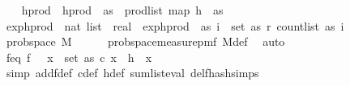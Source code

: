 \begin{isabellebody}
\ \ \isamarkupfalse%
\ h{\isacharunderscore}{\kern0pt}prod\ \ {\isachardoublequoteopen}h{\isacharunderscore}{\kern0pt}prod\ {\isacharequal}{\kern0pt}\ {\isacharparenleft}{\kern0pt}{\isasymlambda}as\ {\isasymomega}{\isachardot}{\kern0pt}\ prod{\isacharunderscore}{\kern0pt}list\ {\isacharparenleft}{\kern0pt}map\ {\isacharparenleft}{\kern0pt}h\ {\isasymomega}{\isacharparenright}{\kern0pt}\ as{\isacharparenright}{\kern0pt}{\isacharparenright}{\kern0pt}{\isachardoublequoteclose}\ \isanewline
\isanewline
\ \ \isamarkupfalse%
\ exp{\isacharunderscore}{\kern0pt}h{\isacharunderscore}{\kern0pt}prod\ {\isacharcolon}{\kern0pt}{\isacharcolon}{\kern0pt}\ {\isachardoublequoteopen}nat\ list\ {\isasymRightarrow}\ real{\isachardoublequoteclose}\ \ {\isachardoublequoteopen}exp{\isacharunderscore}{\kern0pt}h{\isacharunderscore}{\kern0pt}prod\ {\isacharequal}{\kern0pt}\ {\isacharparenleft}{\kern0pt}{\isasymlambda}as{\isachardot}{\kern0pt}\ {\isacharparenleft}{\kern0pt}{\isasymProd}i\ {\isasymin}\ set\ as{\isachardot}{\kern0pt}\ r\ {\isacharparenleft}{\kern0pt}count{\isacharunderscore}{\kern0pt}list\ as\ i{\isacharparenright}{\kern0pt}{\isacharparenright}{\kern0pt}{\isacharparenright}{\kern0pt}{\isachardoublequoteclose}\isanewline
\isanewline
\ \ \isamarkupfalse%
\ prob{\isacharunderscore}{\kern0pt}space\ M\isanewline
\ \ \ \ \isamarkupfalse%
\ prob{\isacharunderscore}{\kern0pt}space{\isacharunderscore}{\kern0pt}measure{\isacharunderscore}{\kern0pt}pmf\ M{\isacharunderscore}{\kern0pt}def\ \isamarkupfalse%
\ auto\isanewline
\isanewline
\ \ \isamarkupfalse%
\ f{\isacharunderscore}{\kern0pt}eq{\isacharcolon}{\kern0pt}\ {\isachardoublequoteopen}f\ {\isacharequal}{\kern0pt}\ {\isacharparenleft}{\kern0pt}{\isasymlambda}{\isasymomega}{\isachardot}{\kern0pt}\ {\isacharparenleft}{\kern0pt}{\isasymSum}x\ {\isasymin}\ set\ as{\isachardot}{\kern0pt}\ c\ x\ {\isacharasterisk}{\kern0pt}\ h\ {\isasymomega}\ x{\isacharparenright}{\kern0pt}{\isacharcircum}{\kern0pt}{}{\isacharparenright}{\kern0pt}{\isachardoublequoteclose}\isanewline
\ \ \ \ \isamarkupfalse%
\ {\isacharparenleft}{\kern0pt}simp\ add{\isacharcolon}{\kern0pt}f{\isacharunderscore}{\kern0pt}def\ c{\isacharunderscore}{\kern0pt}def\ h{\isacharunderscore}{\kern0pt}def\ sum{\isacharunderscore}{\kern0pt}list{\isacharunderscore}{\kern0pt}eval\ del{\isacharcolon}{\kern0pt}f{}{\isacharunderscore}{\kern0pt}hash{\isachardot}{\kern0pt}simps{\isacharparenright}{\kern0pt}\isanewline

\end{isabellebody}
